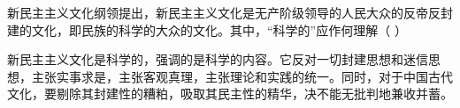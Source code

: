 \question 新民主主义文化纲领提出，新民主主义文化是无产阶级领导的人民大众的反帝反封建的文化，即民族的科学的大众的文化。其中，``科学的''应作何理解（
）
\par\twoch{\textcolor{red}{反对封建思想和迷信思想}}{\textcolor{red}{尊重中国的历史，反对民族虚无主义}}{\textcolor{red}{主张实事求是、客观真理及理论和实践的一致性}}{\textcolor{red}{剔除封建时代文化的糟粕，吸收其民主性精华}}
\begin{solution}新民主主义文化是科学的，强调的是科学的内容。它反对一切封建思想和迷信思想，主张实事求是，主张客观真理，主张理论和实践的统一。同时，对于中国古代文化，要剔除其封建性的糟粕，吸取其民主性的精华，决不能无批判地兼收并蓄。
\end{solution}
